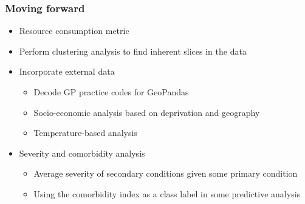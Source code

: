 \begin{frame}
    \frametitle{Moving forward}
    \begin{itemize}
        \pause%
        \item Resource consumption metric
        \pause%
        \item Perform clustering analysis to find inherent slices in the data
        \pause%
        \item Incorporate external data
        \begin{itemize}
            \item Decode GP practice codes for GeoPandas
            \item Socio-economic analysis based on deprivation and geography
            \item Temperature-based analysis
        \end{itemize}
        \pause%
        \item Severity and comorbidity analysis
        \begin{itemize}
            \item Average severity of secondary conditions given some primary
                condition
            \item Using the comorbidity index as a class label in some
                predictive analysis
        \end{itemize}
    \end{itemize}
\end{frame}
